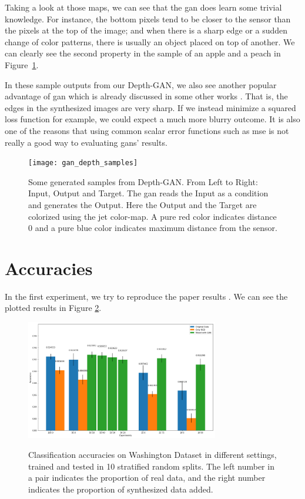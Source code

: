 Taking a look at those maps, we can see that the \acrshort{gan} does
learn some trivial knowledge. For instance, the bottom pixels tend to be closer to the sensor than the
pixels at the top of the image; and when there is a sharp edge or a sudden change of color
patterns, there is usually an object placed on top of another. We can clearly see the
second property in the sample of an apple and a peach in Figure~\ref{fig:gan_depth}.

In these sample outputs from our Depth-GAN, we also see another popular advantage of
\acrshort{gan} which is already discussed in some other works \cite{gan, cogan, pix2pix}.
That is, the edges in the synthesized images are very sharp. If we instead minimize a
squared loss function for example, we could expect a much more blurry outcome. It is also
one of the reasons that using common scalar error functions such as \acrshort{mse} is not
really a good way to evaluating \acrshort{gan}s' results.

\begin{figure}[h]
	\centering
	\texttt{[image: gan\_depth\_samples]}
	\caption{Some generated samples from Depth-GAN. From Left to Right: Input, Output and
		Target. The \acrshort{gan} reads the Input as a condition and generates the
		Output.  Here the Output and the Target are colorized using the jet color-map. A
		pure red color indicates distance 0 and a pure blue color indicates maximum
	distance from the sensor.}
	\label{fig:gan_depth}
\end{figure}


\section{Accuracies}
In the first experiment, we try to reproduce the paper results \cite{eitel}. We can
see the plotted results in Figure \ref{fig:eitel_accuracies}.

\begin{figure}[h]
	\caption{Classification accuracies on Washington Dataset in different settings,
		trained and tested in 10 stratified random splits. The left number in a pair indicates
		the proportion of real data, and the right number indicates the proportion of synthesized
	data added.}
	\centering
	\includegraphics[width=0.75\textwidth]{img/eitel_accuracies}
	\label{fig:eitel_accuracies}
\end{figure}

